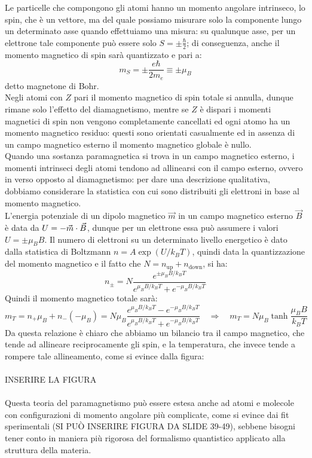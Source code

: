Le particelle che compongono gli atomi hanno un momento angolare intrinseco, lo spin, che è un vettore, ma del quale possiamo misurare solo la componente lungo un determinato asse quando effettuiamo una misura: su qualunque asse, per un elettrone tale componente può essere solo $ S = \pm\frac{\hbar}{2} $; di conseguenza, anche il momento magnetico di spin sarà quantizzato e pari a:
\begin{equation}
	m_S = \pm\frac{e\hbar}{2m_e} \equiv \pm\mu_B
	\label{eq:9}
\end{equation}
detto magnetone di Bohr. \\ 
%
Negli atomi con $ Z $ pari il momento magnetico di spin totale si annulla, dunque rimane solo l'effetto del diamagnetismo, mentre se $ Z $ è dispari i momenti magnetici di spin non vengono completamente cancellati ed ogni atomo ha un momento magnetico residuo: questi sono orientati casualmente ed in assenza di un campo magnetico esterno il momento magnetico globale è nullo. \\ 
%
Quando una sostanza paramagnetica si trova in un campo magnetico esterno, i momenti intrinseci degli atomi tendono ad allinearsi con il campo esterno, ovvero in verso opposto al diamagnetismo: per dare una descrizione qualitativa, dobbiamo considerare la statistica con cui sono distribuiti gli elettroni in base al momento magnetico. \\ 
%
L'energia potenziale di un dipolo magnetico $ \vec{m} $ in un campo magnetico esterno $ \vec{B} $ è data da $ U = - \vec{m}\cdot\vec{B} $, dunque per un elettrone essa può assumere i valori $ U = \pm\mu_B B $. Il numero di elettroni su un determinato livello energetico è dato dalla statistica di Boltzmann $ n = A \exp(U/k_B T) $, quindi data la quantizzazione del momento magnetico e il fatto che $ N = n_{\text{up}} + n_{\text{down}} $, si ha:
\begin{equation}
	n_{\pm} = N \frac{e^{\pm\mu_B B / k_B T}}{e^{\mu_B B / k_B T} + e^{-\mu_B B / k_B T}}
	\label{eq:10}
\end{equation}
Quindi il momento magnetico totale sarà:
\begin{equation}
	m_T = n_+ \mu_B + n_- (-\mu_B) = N\mu_B \frac{e^{\mu_B B / k_B T} - e^{-\mu_B B / k_B T}}{e^{\mu_B B / k_B T} + e^{-\mu_B B / k_B T}} \quad\Longrightarrow\quad m_T = N\mu_B \tanh\frac{\mu_B B}{k_B T}
	\label{eq:11}
\end{equation}
Da questa relazione è chiaro che abbiamo un bilancio tra il campo magnetico, che tende ad allineare reciprocamente gli spin, e la temperatura, che invece tende a rompere tale allineamento, come si evince dalla figura: \\ 
%
%
%
\hbox{}\\ INSERIRE LA FIGURA\\ \hbox{}\\ 
%
%
%
Questa teoria del paramagnetismo può essere estesa anche ad atomi e molecole con configurazioni di momento angolare più complicate, come si evince dai fit sperimentali (SI PUÒ INSERIRE FIGURA DA SLIDE 39-49), sebbene bisogni tener conto in maniera più rigorosa del formalismo quantistico applicato alla struttura della materia.

